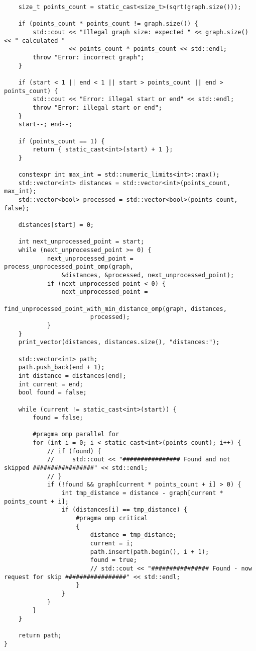 \documentclass{report}
\begin{document}
\begin{lstlisting}
    size_t points_count = static_cast<size_t>(sqrt(graph.size()));

    if (points_count * points_count != graph.size()) {
        std::cout << "Illegal graph size: expected " << graph.size() << " calculated "
                  << points_count * points_count << std::endl;
        throw "Error: incorrect graph";
    }

    if (start < 1 || end < 1 || start > points_count || end > points_count) {
        std::cout << "Error: illegal start or end" << std::endl;
        throw "Error: illegal start or end";
    }
    start--; end--;

    if (points_count == 1) {
        return { static_cast<int>(start) + 1 };
    }

    constexpr int max_int = std::numeric_limits<int>::max();
    std::vector<int> distances = std::vector<int>(points_count, max_int);
    std::vector<bool> processed = std::vector<bool>(points_count, false);

    distances[start] = 0;

    int next_unprocessed_point = start;
    while (next_unprocessed_point >= 0) {
            next_unprocessed_point = process_unprocessed_point_omp(graph,
                &distances, &processed, next_unprocessed_point);
            if (next_unprocessed_point < 0) {
                next_unprocessed_point =
                    find_unprocessed_point_with_min_distance_omp(graph, distances,
                        processed);
            }
    }
    print_vector(distances, distances.size(), "distances:");

    std::vector<int> path;
    path.push_back(end + 1);
    int distance = distances[end];
    int current = end;
    bool found = false;

    while (current != static_cast<int>(start)) {
        found = false;

        #pragma omp parallel for
        for (int i = 0; i < static_cast<int>(points_count); i++) {
            // if (found) {
            //     std::cout << "################ Found and not skipped #################" << std::endl;
            // }
            if (!found && graph[current * points_count + i] > 0) {
                int tmp_distance = distance - graph[current * points_count + i];
                if (distances[i] == tmp_distance) {
                    #pragma omp critical
                    {
                        distance = tmp_distance;
                        current = i;
                        path.insert(path.begin(), i + 1);
                        found = true;
                        // std::cout << "################ Found - now request for skip #################" << std::endl;
                    }
                }
            }
        }
    }

    return path;
}
\end{lstlisting}
\end{document}
